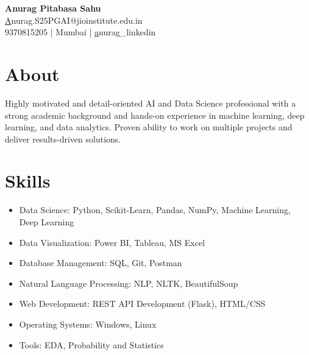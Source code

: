 \documentclass[10pt]{article}
\begin{document}
\begin{center}
    {\Huge \textbf{ Anurag Pitabasa Sahu }}\\
    \vspace{0.05cm} %
    \href{mailto:Anurag.S25PGAI@jioinstitute.edu.in}Anurag.S25PGAI@jioinstitute.edu.in \\
    9370815205 | Mumbai | \href{https://www.linkedin.com/in/anurag-p-sahu/}anurag_linkedin
\end{center}

\section*{About}
\vspace{0.05cm}
Highly motivated and detail-oriented AI and Data Science professional with a strong academic background and hands-on experience in machine learning, deep learning, and data analytics. Proven ability to work on multiple projects and deliver results-driven solutions.


\section*{Skills}
\vspace{0.05cm}
\begin{itemize}[leftmargin=0.5cm, itemsep=2pt] %

  \item Data Science: Python, Scikit-Learn, Pandas, NumPy, Machine Learning, Deep Learning

  \item Data Visualization: Power BI, Tableau, MS Excel

  \item Database Management: SQL, Git, Postman

  \item Natural Language Processing: NLP, NLTK, BeautifulSoup

  \item Web Development: REST API Development (Flask), HTML/CSS

  \item Operating Systems: Windows, Linux

  \item Tools: EDA, Probability and Statistics

\end{itemize}
\end{document}
